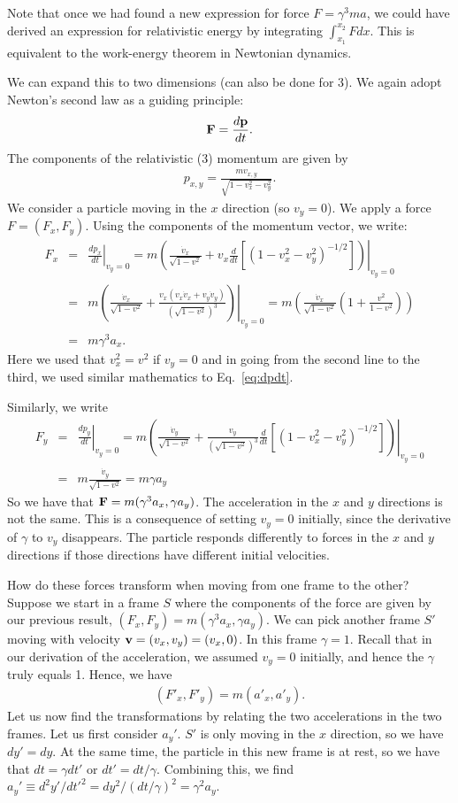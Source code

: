 \documentclass[12pt]{article}
\newcommand{\be}{\begin{eqnarray}}
\newcommand{\ee}{\end{eqnarray}}
\begin{document}
Note that once we had found a new expression for force $F = \gamma^3 ma$, we could have derived an expression for relativistic energy by integrating $\int_{x_1}^{x_2}F dx$. This is equivalent to the work-energy theorem in Newtonian dynamics. 

We can expand this to two dimensions (can also be done for 3). We again adopt Newton's second law as a guiding principle:
\be
{\bf F} = \frac{d{\bf p}}{dt}.
\ee
The components of the relativistic (3) momentum are given by 
\be
p_{x,y} = \frac{m v_{x,y}}{\sqrt{1- v_x^2 - v_y^2}}. 
\ee
We consider a particle moving in the $x$ direction (so $v_y = 0$). We apply a force $F=(F_x,F_y)$. Using the components of the momentum vector, we write:
\be
F_x &=& \left.\frac{d p_x}{dt}\right|_{v_y = 0} = \left.m\left(\frac{\dot{v}_x}{\sqrt{1-v^2}} + v_x\frac{d}{dt} \left[(1-v_x^2 -v_y^2)^{-1/2}\right] \right)\right|_{v_y = 0} \nonumber \\
&=& \left.m\left(\frac{\dot{v}_x}{\sqrt{1-v^2}} + \frac{v_x (v_x \dot{v}_x + v_y \dot{v}_y)}{(\sqrt{1-v^2})^3}\right)\right|_{v_y = 0} = m\left(\frac{\dot{v}_x}{\sqrt{1-v^2}} \left(1+\frac{v^2}{1-v^2}\right)\right) \nonumber \\
&=& m \gamma^3 a_x.
\ee
Here we used that $v_x^2 = v^2$ if $v_y = 0$ and in going from the second line to the third, we used similar mathematics to Eq.~\eqref{eq:dpdt}. 

Similarly, we write 
\be
F_y &=& \left.\frac{d p_y}{dt}\right|_{v_y = 0} = \left.m\left(\frac{\dot{v}_y}{\sqrt{1-v^2}} + \frac{v_y}{(\sqrt{1-v^2})^3}\frac{d}{dt} \left[(1-v_x^2 -v_y^2)^{-1/2}\right] \right)\right|_{v_y = 0} \nonumber \\
&=& m\frac{\dot{v}_y}{\sqrt{1-v^2}} = m\gamma a_y
\ee
So we have that ${\bf F} = m(\gamma^3 a_x, \gamma a_y)$. The acceleration in the $x$ and $y$ directions is not the same. This is a consequence of setting $v_y = 0$ initially, since the derivative of $\gamma$ to $v_y$ disappears. The particle responds differently to forces in the $x$ and $y$ directions if those directions have different initial velocities.  

How do these forces transform when moving from one frame to the other? Suppose we start in a frame $S$ where the components of the force are given by our previous result, $(F_x, F_y) = m(\gamma^3 a_x, \gamma a_y)$. We can pick another frame $S'$  moving with velocity ${\bf v} = (v_x,v_y) = (v_x,0)$. In this frame  $\gamma = 1$. Recall that in our derivation of the acceleration, we assumed $v_y = 0$ initially, and hence the $\gamma$ truly equals 1. Hence, we have 
\be
(F'_x, F'_y) = m(a'_x, a'_y).
\ee
Let us now find the transformations by relating the two accelerations in the two frames. Let us first consider $a_y'$. $S'$ is only moving in the $x$ direction, so we have $dy' = dy$. At the same time, the particle in this new frame is at rest, so we have that $dt= \gamma dt'$ or $dt' = dt/\gamma$. Combining this, we find $a_y'\equiv d^2y'/dt'^2 = dy^2/(dt/\gamma)^2 = \gamma^2 a_y$. 
\end{document}
